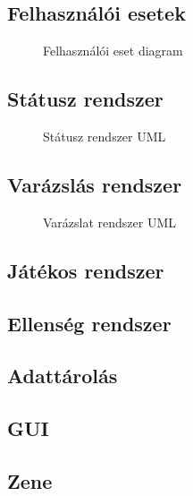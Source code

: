 \subsection{Felhasználói esetek}
\begin{figure}[H]
	\noindent{}
	\caption{Felhasználói eset diagram}
	\label{useCase}
\end{figure}

\subsection{Státusz rendszer}

\begin{figure}[H]
	\noindent{}
	\caption{Státusz rendszer UML}
	\label{StatusSystem}
\end{figure}

\subsection{Varázslás rendszer}

\begin{figure}[H]
	\noindent{}
	\caption{Varázslat rendszer UML}
	\label{MagicSystem}
\end{figure}

\subsection{Játékos rendszer}

\subsection{Ellenség rendszer}

\subsection{Adattárolás}

\subsection{GUI}

\subsection{Zene}


